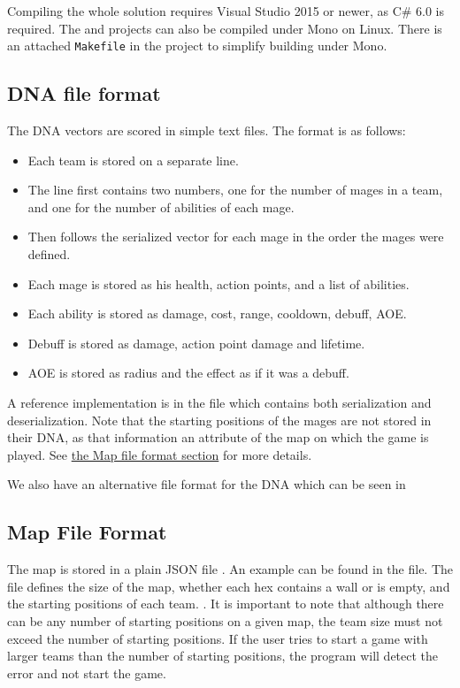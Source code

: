 Compiling the whole solution requires Visual Studio 2015 or newer, as C\# 6.0 is required. The  and  projects can also be compiled under Mono on Linux. There is an attached \verb|Makefile| in the  project to simplify building under Mono.

\subsection{DNA file format}
\label{dna-format}

The DNA vectors are scored in simple text files. The format is as follows:

\begin{itemize}
	\item Each team is stored on a separate line.
	\item The line first contains two numbers, one for the number of mages in a team, and one for the number of abilities of each mage.
	\item Then follows the serialized vector for each mage in the order the mages were defined.
	\item Each mage is stored as his health, action points, and a list of abilities.
	\item Each ability is stored as damage, cost, range, cooldown, debuff, AOE.
	\item Debuff is stored as damage, action point damage and lifetime.
	\item AOE is stored as radius and the effect as if it was a debuff.
\end{itemize}

A reference implementation is in the  file which contains both serialization and deserialization. Note that the starting positions of the mages are not stored in their DNA, as that information an attribute of the map on which the game is played. See \hyperref[map-format]{the Map file format section} for more details.

We also have an alternative file format for the DNA which can be seen in

\subsection{Map File Format}
\label{map-format}

The map is stored in a plain JSON file \citep{json}. An example can be found in the  file. The file defines the size of the map, whether each hex contains a wall or is empty, and the starting positions of each team. . It is important to note that although there can be any number of starting positions on a given map, the team size must not exceed the number of starting positions. If the user tries to start a game with larger teams than the number of starting positions, the program will detect the error and not start the game.

